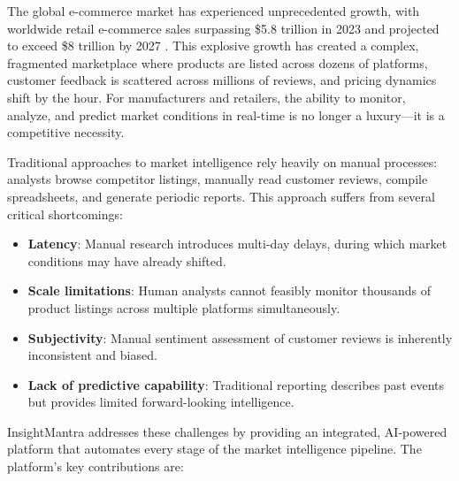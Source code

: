 \documentclass[conference]{IEEEtran}
\begin{document}
The global e-commerce market has experienced unprecedented growth, with worldwide retail e-commerce sales surpassing \$5.8 trillion in 2023 and projected to exceed \$8 trillion by 2027 \cite{b1}. This explosive growth has created a complex, fragmented marketplace where products are listed across dozens of platforms, customer feedback is scattered across millions of reviews, and pricing dynamics shift by the hour. For manufacturers and retailers, the ability to monitor, analyze, and predict market conditions in real-time is no longer a luxury---it is a competitive necessity.

Traditional approaches to market intelligence rely heavily on manual processes: analysts browse competitor listings, manually read customer reviews, compile spreadsheets, and generate periodic reports. This approach suffers from several critical shortcomings:

\begin{itemize}
    \item \textbf{Latency}: Manual research introduces multi-day delays, during which market conditions may have already shifted.
    \item \textbf{Scale limitations}: Human analysts cannot feasibly monitor thousands of product listings across multiple platforms simultaneously.
    \item \textbf{Subjectivity}: Manual sentiment assessment of customer reviews is inherently inconsistent and biased.
    \item \textbf{Lack of predictive capability}: Traditional reporting describes past events but provides limited forward-looking intelligence.
\end{itemize}

InsightMantra addresses these challenges by providing an integrated, AI-powered platform that automates every stage of the market intelligence pipeline. The platform's key contributions are:
\end{document}
